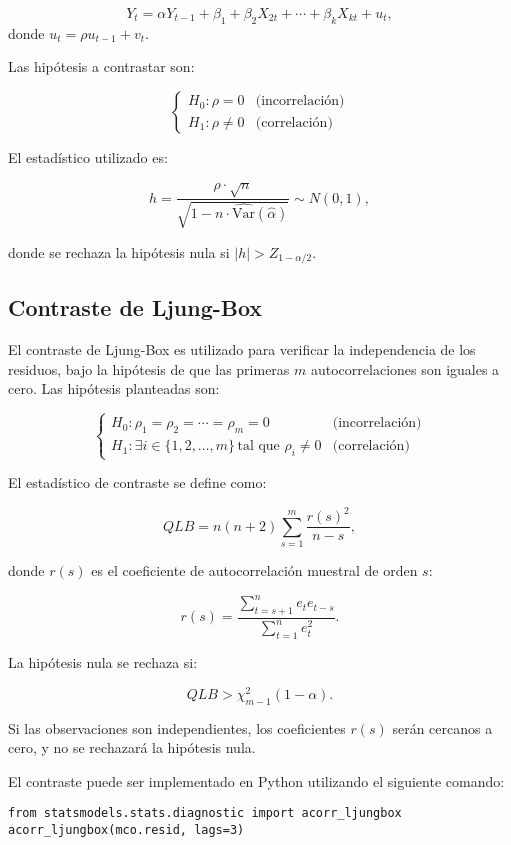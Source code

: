\documentclass[a4paper,12pt]{article}
\begin{document}
\[
Y_t = \alpha Y_{t-1} + \beta_1 + \beta_2 X_{2t} + \cdots + \beta_k X_{kt} + u_t,
\]
donde $u_t = \rho u_{t-1} + v_t$.

Las hipótesis a contrastar son:

\[
\begin{cases}
H_0 : \rho = 0 & \text{(incorrelación)} \\
H_1 : \rho \neq 0 & \text{(correlación)}
\end{cases}
\]

El estadístico utilizado es:

\[
h = \frac{\rho \cdot \sqrt{n}}{\sqrt{1 - n \cdot \widehat{\text{Var}}(\widehat{\alpha})}} \sim N(0, 1),
\]

donde se rechaza la hipótesis nula si $|h| > Z_{1 - \alpha / 2}$.

\subsection{Contraste de Ljung-Box}

El contraste de Ljung-Box es utilizado para verificar la independencia de los residuos, bajo la hipótesis de que las primeras $m$ autocorrelaciones son iguales a cero. Las hipótesis planteadas son:

\[
\begin{cases}
H_0 : \rho_1 = \rho_2 = \cdots = \rho_m = 0 & \text{(incorrelación)} \\
H_1 : \exists i \in \{1, 2, \dots, m\} \, \text{tal que } \rho_i \neq 0 & \text{(correlación)}
\end{cases}
\]

El estadístico de contraste se define como:

\[
QLB = n(n + 2) \sum_{s=1}^m \frac{r(s)^2}{n - s},
\]

donde $r(s)$ es el coeficiente de autocorrelación muestral de orden $s$:

\[
r(s) = \frac{\sum_{t=s+1}^n e_t e_{t-s}}{\sum_{t=1}^n e_t^2}.
\]

La hipótesis nula se rechaza si:

\[
QLB > \chi^2_{m-1}(1 - \alpha).
\]

Si las observaciones son independientes, los coeficientes $r(s)$ serán cercanos a cero, y no se rechazará la hipótesis nula.

El contraste puede ser implementado en Python utilizando el siguiente comando:

\begin{verbatim}
from statsmodels.stats.diagnostic import acorr_ljungbox
acorr_ljungbox(mco.resid, lags=3)
\end{verbatim}
\end{document}
